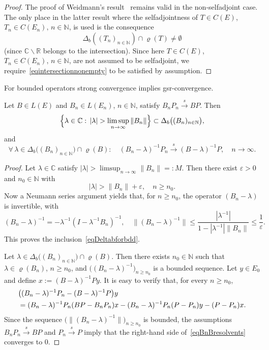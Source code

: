 \documentclass[a4paper,reqno]{amsart}
\begin{document}
{\begin{proof}
The proof of Weidmann's result~\cite[Satz~9.29~a)]{weid1} remains valid in the non-selfadjoint case.
The only place in the latter result where the selfadjointness of $T\in C(E)$, $T_n\in C(E_n), \,n\in{\mathbb{N}}$, is used is the consequence 
\begin{equation} \Delta_b\left((T_n)_{n\in{\mathbb{N}}}\right)\cap\varrho(T)\neq\emptyset \label{eqintersectionnonempty}\end{equation}
(since ${\mathbb{C}}\backslash{\mathbb{R}}$ belongs to the intersection).
Since here $T\in C(E)$, $T_n\in C(E_n), \,n\in{\mathbb{N}}$, are not assumed to be selfadjoint, we require~\eqref{eqintersectionnonempty} to be satisfied by assumption.
\end{proof}

For bounded operators strong convergence implies gsr-convergence.
\begin{lemma}\label{lemmabddstongconv}
 Let $B\in L(E)$ and $B_n\in L(E_n)$, $n\in{\mathbb{N}}$, satisfy $B_nP_n{\stackrel{s}{\rightarrow}} BP$. Then \begin{equation} \Big\{\lambda\in{\mathbb{C}}:\,|\lambda|>\limsup_{n\to\infty}\|B_n\|\Big\}\subset\Delta_b\big((B_n)_{n\in{\mathbb{N}}}\big),\vspace{-1mm}\label{eqDeltabforbdd}\end{equation}
and $$\forall\,\lambda\in \Delta_b\big((B_n)_{n\in{\mathbb{N}}}\big)\cap\varrho(B):\quad (B_n-\lambda)^{-1}P_n{\stackrel{s}{\longrightarrow}} (B-\lambda)^{-1}P, \quad n\to\infty.$$
\end{lemma}

\begin{proof}
Let $\lambda\in{\mathbb{C}}$ satisfy $|\lambda|>\limsup_{n\to\infty}\|B_n\|=:M$. Then there exist $\varepsilon>0$ and $n_0\in{\mathbb{N}}$ with $$|\lambda|>\|B_n\|+\varepsilon, \quad n\geq n_0.$$
Now a Neumann series argument yields that, for $n\geq n_0$, the operator $(B_n-\lambda)$ is invertible, with 
$$(B_n-\lambda)^{-1}=-\lambda^{-1}(I-\lambda^{-1}B_n)^{-1}, \quad \|(B_n-\lambda)^{-1}\|\leq \frac{|\lambda^{-1}|}{1-|\lambda^{-1}|\|B_n\|}\leq \frac{1}\varepsilon.$$
This proves the inclusion~\eqref{eqDeltabforbdd}.

 Let $\lambda\in \Delta_b\big((B_n)_{n\in{\mathbb{N}}}\big)\cap\varrho(B)$.
Then there exists $n_0\in{\mathbb{N}}$ such that $\lambda\in\varrho(B_n)$, $n\geq n_0$, and $\big((B_n-\lambda)^{-1}\big)_{n\geq n_0}$ is a bounded sequence.
Let $y\in E_0$ and define $x:=(B-\lambda)^{-1}Py$. It is easy to verify that, for every $n\geq n_0$,
\begin{align}
 &\big((B_n-\lambda)^{-1}P_n-(B-\lambda)^{-1}P\big)y\notag\\
&=(B_n-\lambda)^{-1}P_n(BP-B_nP_n)x-(B_n-\lambda)^{-1}P_n (P-P_n)y-(P-P_n)x.\label{eqBnBresolvents}
\end{align}
Since the sequence $\big(\|(B_n-\lambda)^{-1}\|\big)_{n\geq n_0}$ is bounded,
the assumptions $B_nP_n{\stackrel{s}{\rightarrow}} BP$ and $P_n{\stackrel{s}{\rightarrow}} P$ imply that the right-hand side of~\eqref{eqBnBresolvents} converges to $0$. 
\end{proof}

}
\end{document}
